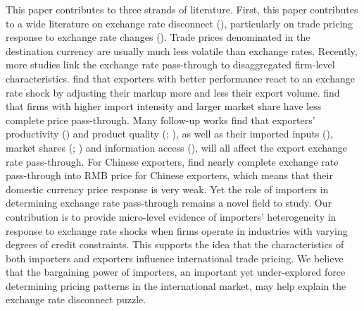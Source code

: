 \documentclass[12pt]{article}
\begin{document}
This paper contributes to three strands of literature. First, this paper contributes to a wide literature on exchange rate disconnect (\cite{obstfeld2000}), particularly on trade pricing response to exchange rate changes (\cite{campa2005}). Trade prices denominated in the destination currency are usually much less volatile than exchange rates. Recently, more studies link the exchange rate pass-through to disaggregated firm-level characteristics. \cite{bmm2012} find that exporters with better performance react to an exchange rate shock by adjusting their markup more and less their export volume. \cite{aik2014} find that firms with higher import intensity and larger market share have less complete price pass-through. Many follow-up works find that exporters' productivity (\cite{lmx2015}) and product quality (\cite{chen2016}; \cite{auer2018}), as well as their imported inputs (\cite{wang-yu2021}), market shares (\cite{auer2016}; \cite{devereux2017}) and information access (\cite{garetto2016}), will all affect the export exchange rate pass-through. For Chinese exporters, \cite{lmx2015} find nearly complete exchange rate pass-through into RMB price for Chinese exporters, which means that their domestic currency price response is very weak. Yet the role of importers in determining exchange rate pass-through remains a novel field to study. Our contribution is to provide micro-level evidence of importers' heterogeneity in response to exchange rate shocks when firms operate in industries with varying degrees of credit constraints. This supports the idea that the characteristics of both importers and exporters influence international trade pricing. We believe that the bargaining power of importers, an important yet under-explored force determining pricing patterns in the international market, may help explain the exchange rate disconnect puzzle. 
\end{document}
